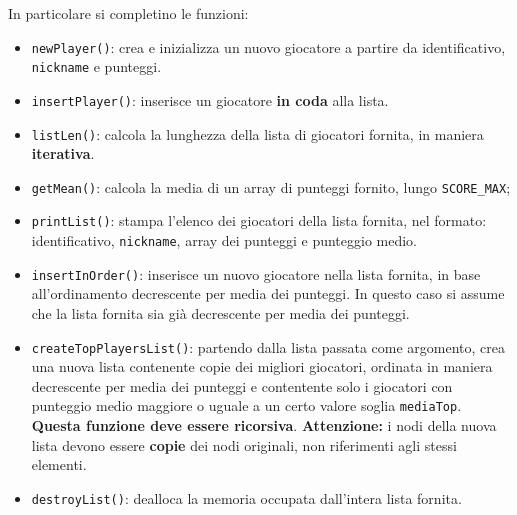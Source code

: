 \documentclass[12pt]{article}
\begin{document}
\vspace{10pt}
\noindent
In particolare si completino le funzioni:
\begin{itemize}

\item \texttt{newPlayer()}: crea e inizializza un nuovo giocatore a partire da identificativo, \texttt{nickname} e punteggi.

\item \texttt{insertPlayer()}: inserisce un giocatore \textbf{in coda} alla lista.

\item \texttt{listLen()}: calcola la lunghezza della lista di giocatori fornita, in maniera \textbf{iterativa}.

\item \texttt{getMean()}: calcola la media di un array di punteggi fornito, lungo \texttt{SCORE\_MAX};

\item \texttt{printList()}: stampa l'elenco dei giocatori della lista fornita, nel formato: identificativo, \texttt{nickname}, array dei punteggi e punteggio medio.

\item \texttt{insertInOrder()}: inserisce un nuovo giocatore nella lista fornita, in base all'ordinamento decrescente per media dei punteggi. In questo caso si assume che la lista fornita sia gi\`a decrescente per media dei punteggi.

\item \texttt{createTopPlayersList()}: partendo dalla lista passata come argomento, crea una nuova lista contenente copie
  dei migliori giocatori, ordinata in maniera decrescente per media dei punteggi
  e contentente solo i giocatori con punteggio medio maggiore o uguale a un certo valore
  soglia \texttt{mediaTop}. \textbf{Questa funzione deve essere ricorsiva}.
  \textbf{Attenzione:} i nodi della nuova lista devono essere \textbf{copie} dei nodi originali,
  non riferimenti agli stessi elementi.

\item \texttt{destroyList()}: dealloca la memoria occupata dall'intera lista fornita.

\end{itemize}
\end{document}
